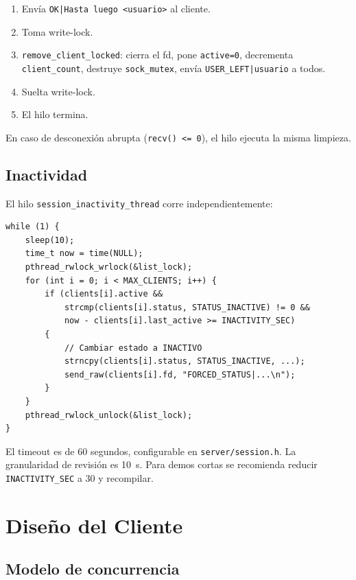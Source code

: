 \documentclass[12pt,a4paper]{article}
\begin{document}
\begin{enumerate}[nosep]
    \item Envía \texttt{OK|Hasta luego <usuario>} al cliente.
    \item Toma write-lock.
    \item \texttt{remove\_client\_locked}: cierra el fd, pone \texttt{active=0},
          decrementa \texttt{client\_count}, destruye \texttt{sock\_mutex},
          envía \texttt{USER\_LEFT|usuario} a todos.
    \item Suelta write-lock.
    \item El hilo termina.
\end{enumerate}

En caso de desconexión abrupta (\texttt{recv() <= 0}), el hilo ejecuta la misma
limpieza.

\subsection{Inactividad}

El hilo \texttt{session\_inactivity\_thread} corre independientemente:

\begin{lstlisting}[caption={Hilo de inactividad (simplificado)}]
while (1) {
    sleep(10);
    time_t now = time(NULL);
    pthread_rwlock_wrlock(&list_lock);
    for (int i = 0; i < MAX_CLIENTS; i++) {
        if (clients[i].active &&
            strcmp(clients[i].status, STATUS_INACTIVE) != 0 &&
            now - clients[i].last_active >= INACTIVITY_SEC)
        {
            // Cambiar estado a INACTIVO
            strncpy(clients[i].status, STATUS_INACTIVE, ...);
            send_raw(clients[i].fd, "FORCED_STATUS|...\n");
        }
    }
    pthread_rwlock_unlock(&list_lock);
}
\end{lstlisting}

El timeout es de 60 segundos, configurable en \texttt{server/session.h}.  La
granularidad de revisión es 10~s.  Para demos cortas se recomienda reducir
\texttt{INACTIVITY\_SEC} a 30 y recompilar.

\section{Diseño del Cliente}
\label{sec:cliente}

\subsection{Modelo de concurrencia}
\end{document}
